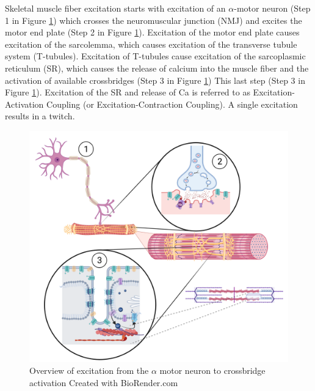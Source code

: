 Skeletal muscle fiber excitation starts with excitation of an $\alpha$-motor neuron (Step 1 in Figure \ref{fig:excitation_overview}) which crosses the neuromuscular junction (NMJ) and excites the motor end plate (Step 2 in Figure \ref{fig:excitation_overview}). Excitation of the motor end plate causes excitation of the sarcolemma, which causes excitation of the transverse tubule system (T-tubules). Excitation of T-tubules cause excitation of the sarcoplasmic reticulum (SR), which causes the release of calcium into the muscle fiber and the activation of available crossbridges (Step 3 in Figure \ref{fig:excitation_overview}) This last step (Step 3 in Figure \ref{fig:excitation_overview}). Excitation of the SR and release of Ca is referred to as Excitation-Activation Coupling (or Excitation-Contraction Coupling). A single excitation results in a twitch.

\begin{figure}[!ht]
    \centering
    \includegraphics[width=1\linewidth]{./figure/excitation_overview.png}
    \caption{Overview of excitation from the $\alpha$ motor neuron to crossbridge activation \footnotesize{Created with BioRender.com}}
    \label{fig:excitation_overview}
\end{figure}

